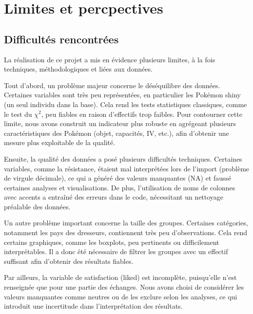 \documentclass[mstat,12pt]{unswthesis}
\begin{document}
\chapter{Limites et percpectives}\label{limites-et-percpectives}

\section{Difficultés rencontrées}\label{difficultuxe9s-rencontruxe9es}

La réalisation de ce projet a mis en évidence plusieurs limites, à la
fois techniques, méthodologiques et liées aux données.

\medskip

Tout d'abord, un problème majeur concerne le déséquilibre des données.
Certaines variables sont très peu représentées, en particulier les
Pokémon shiny (un seul individu dans la base). Cela rend les tests
statistiques classiques, comme le test du \(\chi^2\), peu fiables en
raison d'effectifs trop faibles. Pour contourner cette limite, nous
avons construit un indicateur plus robuste en agrégeant plusieurs
caractéristiques des Pokémon (objet, capacités, IV, etc.), afin
d'obtenir une mesure plus exploitable de la qualité.

\medskip

Ensuite, la qualité des données a posé plusieurs difficultés techniques.
Certaines variables, comme la résistance, étaient mal interprétées lors
de l'import (problème de virgule décimale), ce qui a généré des valeurs
manquantes (NA) et faussé certaines analyses et visualisations. De plus,
l'utilisation de noms de colonnes avec accents a entraîné des erreurs
dans le code, nécessitant un nettoyage préalable des données.

\medskip

Un autre problème important concerne la taille des groupes. Certaines
catégories, notamment les pays des dresseurs, contiennent très peu
d'observations. Cela rend certains graphiques, comme les boxplots, peu
pertinents ou difficilement interprétables. Il a donc été nécessaire de
filtrer les groupes avec un effectif suffisant afin d'obtenir des
résultats fiables.

\medskip

Par ailleurs, la variable de satisfaction (liked) est incomplète,
puisqu'elle n'est renseignée que pour une partie des échanges. Nous
avons choisi de considérer les valeurs manquantes comme neutres ou de
les exclure selon les analyses, ce qui introduit une incertitude dans
l'interprétation des résultats.
\end{document}
